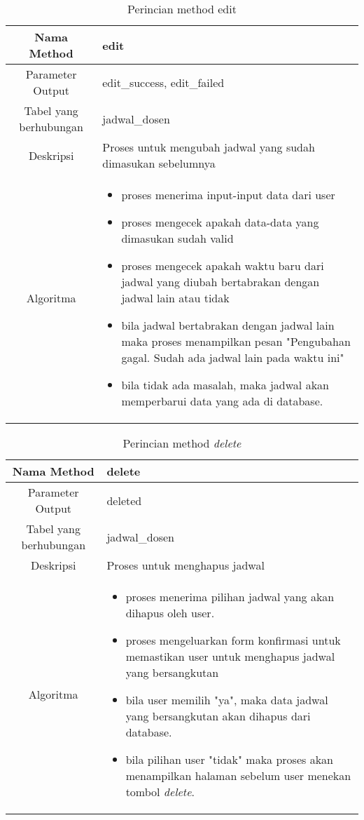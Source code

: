 \begin{center}
\begin{table}[H]
\begin{tabular}{|c|p{11cm}|}
\hline
Nama Method 	& 	edit 	\\
\hline
Parameter Output & edit\_success, edit\_failed \\
\hline
Tabel yang berhubungan & jadwal\_dosen \\
\hline
Deskripsi	& Proses untuk mengubah jadwal yang sudah dimasukan sebelumnya \\
\hline
Algoritma	& \begin{itemize}
				\item proses menerima input-input data dari user
				\item proses mengecek apakah data-data yang dimasukan sudah valid
				\item proses mengecek apakah waktu baru dari jadwal yang diubah bertabrakan dengan jadwal lain atau tidak
				\item bila jadwal bertabrakan dengan jadwal lain maka proses menampilkan pesan "Pengubahan gagal. Sudah ada jadwal lain pada waktu ini"
				\item bila tidak ada masalah, maka jadwal akan memperbarui data yang ada di database.
				\end{itemize} \\
\hline
\end{tabular}
\caption{Perincian method edit}
\end{table}
\end{center}

\begin{center}
\begin{table}[H]
\begin{tabular}{|c|p{11cm}|}
\hline
Nama Method 	& 	delete 	\\
\hline
Parameter Output & deleted \\
\hline
Tabel yang berhubungan & jadwal\_dosen \\
\hline
Deskripsi	& Proses untuk menghapus jadwal \\
\hline
Algoritma	& \begin{itemize}
				\item proses menerima pilihan jadwal yang akan dihapus oleh user.
				\item proses mengeluarkan form konfirmasi untuk memastikan user untuk menghapus jadwal yang bersangkutan
				\item bila user memilih "ya", maka data jadwal yang bersangkutan akan dihapus dari database.
				\item bila pilihan user "tidak" maka proses akan menampilkan halaman sebelum user menekan tombol \textit{delete}.
				\end{itemize} \\
\hline
\end{tabular}
\caption{Perincian method \textit{delete}}
\end{table}
\end{center}


